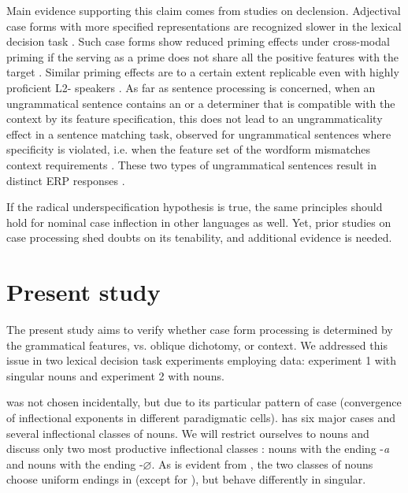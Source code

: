 \documentclass[output=paper, modfonts,newtxmath,hidelinks]{langscibook}
\begin{document}
Main evidence supporting this claim comes from studies on   declension. Adjectival case forms with more specified representations are recognized slower in the lexical decision task \citep{clahsen2001mental}. Such case forms show reduced priming effects under cross-modal priming if the  serving as a prime does not share all the positive features with the target \citep{clahsen2001mental}. Similar priming effects are to a certain extent replicable even with highly proficient L2- speakers \citep{bosch2016accessing, bosch2017time}. As far as sentence processing is concerned, when an ungrammatical sentence contains an  or a determiner that is compatible with the context by its feature specification, this does not lead to an ungrammaticality effect in a sentence matching task, observed for ungrammatical sentences where specificity is violated, i.e. when the feature set of the wordform mismatches context requirements \citep{penke2004psycholinguistic}. These two types of ungrammatical sentences result in distinct ERP responses \citep{opitz2013neurophysiological}. 

If the radical underspecification hypothesis is true, the same principles should hold for nominal case inflection in other languages as well. Yet, prior studies on case processing shed doubts on its tenability, and additional evidence is needed.

\section{Present study}\label{sec:2}
The present study aims to verify whether case form processing is determined by the grammatical features,  vs. oblique dichotomy, or context. We addressed this issue in two lexical decision task experiments employing  data: experiment 1 with singular nouns and experiment 2 with  nouns.

 was not chosen incidentally, but due to its particular pattern of case  (convergence of inflectional exponents in different paradigmatic cells).  has six major cases and several inflectional classes of nouns. We will restrict ourselves to  nouns and discuss only two most productive inflectional classes \citep{wiese2004categories}:  nouns with the  ending -\textit{a} and  nouns with the   ending -$\varnothing$. As is evident from , the two classes of nouns choose uniform endings in  (except for ), but behave differently in singular.
\end{document}
